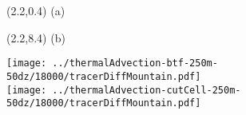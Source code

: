 \documentclass{article}
\begin{document}
\TPMargin{3pt}
\begin{textblock}{0.75}(2.2,0.4)
\normalsize
\centering
(a)
\end{textblock}
\begin{textblock}{0.75}(2.2,8.4)
\normalsize
\centering
(b)
\end{textblock}
\centering
\texttt{[image: ../thermalAdvection-btf-250m-50dz/18000/tracerDiffMountain.pdf]} \\
\vspace*{0.1in}
\texttt{[image: ../thermalAdvection-cutCell-250m-50dz/18000/tracerDiffMountain.pdf]}
\end{document}
